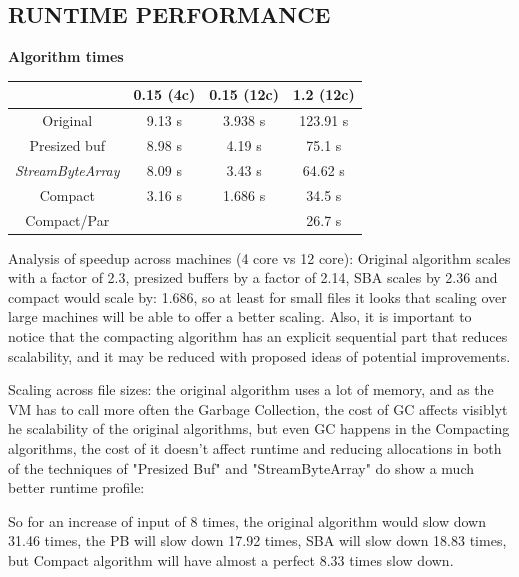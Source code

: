 \documentclass[a4paper,twoside]{article}
\begin{document}
\subsection{\uppercase{Runtime performance}}
\begin{small}
\par
\textbf{Algorithm times} \\
\vspace{-0.4cm}
\begin{center}
\begin{tabular}{|c|c|c|c|}
\hline
						& 0.15 (4c)		    & 0.15 (12c)		& 1.2 (12c) 			\\ \hline
Original				& 9.13 s			& 3.938 s			& 123.91 s			\\ \hline
Presized buf   			& 8.98 s			& 4.19 s			& 75.1 s	\\ \hline
{\it StreamByteArray}	& 8.09 s			& 3.43 s			& 64.62 s			\\ \hline
Compact 				& 3.16 s			& 1.686 s			& 34.5 s	\\ \hline
Compact/Par 			& 			        & 					& 26.7 s	\\ \hline
\end{tabular}
\end{center}
\end{small}

Analysis of speedup across machines (4 core vs 12 core):
Original algorithm scales with a factor of 2.3, presized buffers by a factor of 2.14, SBA scales by 2.36
and compact would scale by: 1.686, so at least for small files it looks that scaling over large machines will be able to offer a better scaling. Also, it is important to notice that the compacting algorithm has an explicit sequential part that reduces scalability, and it may be reduced with proposed ideas 
of potential improvements.

Scaling across file sizes: the original algorithm uses a lot of memory, and as the VM has to call more often the Garbage Collection, the cost of GC affects visiblyt he scalability of the original algorithms, but even GC happens in the Compacting algorithms, the cost of it doesn't affect runtime and reducing allocations in both of the techniques of "Presized Buf" and "StreamByteArray" do show a much better runtime profile:

So for an increase of input of 8 times, the original algorithm would slow down 31.46 times, the PB will slow down 17.92 times, SBA will slow down 18.83 times, but Compact algorithm will have almost a perfect 8.33 times slow down.
\end{document}
